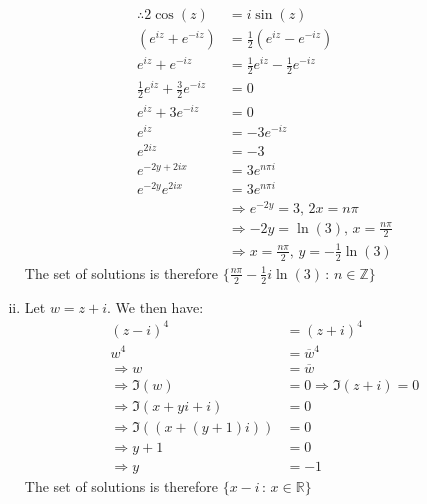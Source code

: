 \documentclass[a4paper, titlepage, DIV=14]{scrartcl}
\begin{document}
\begin{enumerate}[(i)]
        \begin{align*}
            \therefore 2\cos(z) &= i\sin(z) \\
            (e^{iz}+e^{-iz}) &= \frac{1}{2}(e^{iz}-e^{-iz}) \\
            e^{iz}+e^{-iz} &= \frac{1}{2}e^{iz} - \frac{1}{2}e^{-iz} \\
            \frac{1}{2}e^{iz} + \frac{3}{2}e^{-iz} &= 0 \\
            e^{iz} + 3e^{-iz} &= 0 \\
            e^{iz} &= -3e^{-iz} \\
            e^{2iz} &= -3 \\
            e^{-2y+2ix} &= 3e^{n\pi i} \\
            e^{-2y}e^{2ix} &= 3e^{n\pi i} \\
            &\Rightarrow e^{-2y} = 3, \, 2x = n\pi \\
            &\Rightarrow -2y = \ln(3), \, x = \frac{n\pi}{2} \\
            &\Rightarrow x = \frac{n\pi}{2}, \, y = -\frac{1}{2}\ln(3)
        \end{align*}
        The set of solutions is therefore $\{\frac{n\pi}{2} - \frac{1}{2}i\ln(3) \, : \, n \in \mathbb{Z}\}$ \\
        
        \item Let $w = z+i$. We then have:
        \begin{align*}
            (z-i)^{4} &= (z+i)^{4} \\
            w^{4} &= \overline{w}^{4} \\
            \Rightarrow w &= \overline{w} \\ 
            \Rightarrow \Im(w) &= 0 \Rightarrow \Im(z+i) = 0 \\
            \Rightarrow \Im(x+yi + i) &= 0 \\
            \Rightarrow \Im((x+(y+1)i)) &= 0 \\
            \Rightarrow y+1 &= 0 \\
            \Rightarrow y &= -1
        \end{align*}
        The set of solutions is therefore $\{x - i \, : \, x \in \mathbb{R}\}$

    \end{enumerate}
\end{document}
